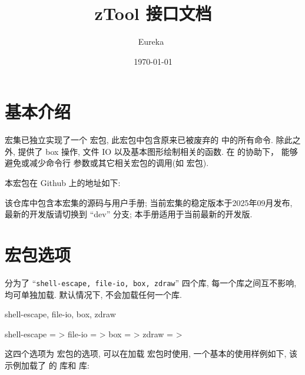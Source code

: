 \documentclass[
  hyper, 
  lang = cn, 
  class = l3doc,
  classOption={11pt},
  sect = {load=false},
]{../../zlatex/code/ztex}
\title{zTool 接口文档}
\author{Eureka~\rlap{\wscale*{7.5em}{\normalfont\small\sffamily\color{gray}zongpingding5(at)outlook(dot)com}}}
\date{\textsf{\today}}
\begin{document}
\ExplSyntaxOn
{}
\ExplSyntaxOff
{}
  \maketitle
\restoregeometry

\restoregeometry
\fancyheadoffset{0pt}

\section{基本介绍}
\ztex{} 宏集已独立实现了一个  宏包, 此宏包中包含原来已被废弃的  中的所有命令.
除此之外,  提供了 box 操作, 文件 IO 以及基本图形绘制相关的函数. 在  的协助下，\ztex{} 能够
避免或减少命令行  参数或其它相关宏包的调用(如  宏包).

本宏包在 Github 上的地址如下:

\begin{center}
\end{center}

该仓库中包含本宏集的源码与用户手册; 当前宏集的稳定版本于2025年09月发布, 最新的开发版请切换到 ``dev'' 分支; 
本手册适用于当前最新的开发版.

\clearpage
\section{宏包选项}
 分为了 ``\texttt{shell-escape, file-io, box, zdraw}'' 四个库, 每一个库之间互不影响, 均可单独加载.
默认情况下,  不会加载任何一个库.


\begin{keyval}[added=2025-05-22, parent=ztool]{shell-escape, file-io, box, zdraw}
  \begin{syntax}
    shell-escape = >
    file-io      = >
    box          = >
    zdraw        = >
  \end{syntax}
  这四个选项为  宏包的选项, 可以在加载  宏包时使用, 一个基本的使用样例如下,
  该示例加载了  的  库和  库:
\end{keyval}
\begin{DocExample}
\usepackage[shell-escape, box=true]{ztool}
\end{DocExample}
\end{document}
